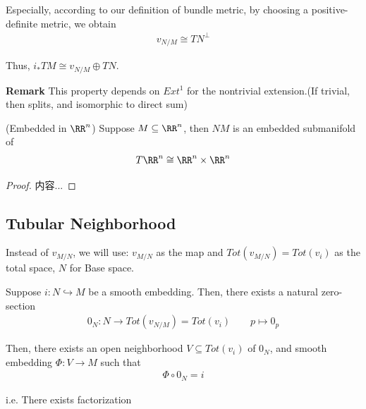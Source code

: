 \documentclass[Total.tex]{subfiles}
\begin{document}
				Especially, according to our definition of bundle metric, by choosing a positive-definite metric, we obtain 
				\begin{gather*}
					v_{N/M}\cong TN^\perp
				\end{gather*}
				
				Thus, $i_* TM\cong v_{N/M}\oplus TN$. 
				
				\textbf{Remark} This property depends on $Ext^1$ for the nontrivial extension.(If trivial, then splits, and isomorphic to direct sum) 
				
				\begin{proposition}
					(Embedded in $\RR^n$) Suppose $M\subseteq \RR^n$, then $NM$ is an embedded submanifold of 
					\begin{gather*}
						T\RR^n\cong \RR^n\times \RR^n
					\end{gather*}
				\end{proposition}
				\begin{proof}
					内容...
				\end{proof}
				
				\subsection{Tubular Neighborhood}
				Instead of $v_{M/N}$, we will use: $v_{M/N}$ as the map and $Tot(v_{M/N})=Tot(v_i)$ as the total space, $N$ for Base space. 
				
				\begin{theorem}
					Suppose $i:N\hookrightarrow M$ be a smooth embedding. Then, there exists a natural zero-section 
					\begin{gather*}
						0_{N}:N\rightarrow Tot(v_{N/M})=Tot(v_i)\qquad p\mapsto 0_p
					\end{gather*}
					
					Then, there exists an open neighborhood $V\subseteq Tot(v_i)$ of $0_N$, and smooth embedding $\Phi:V\rightarrow M$ such that
					\begin{gather*}
						\Phi\circ 0_N=i
					\end{gather*}
				\end{theorem}
				
				i.e. There exists factorization
				\begin{center}
				\end{center}
				
\end{document}
